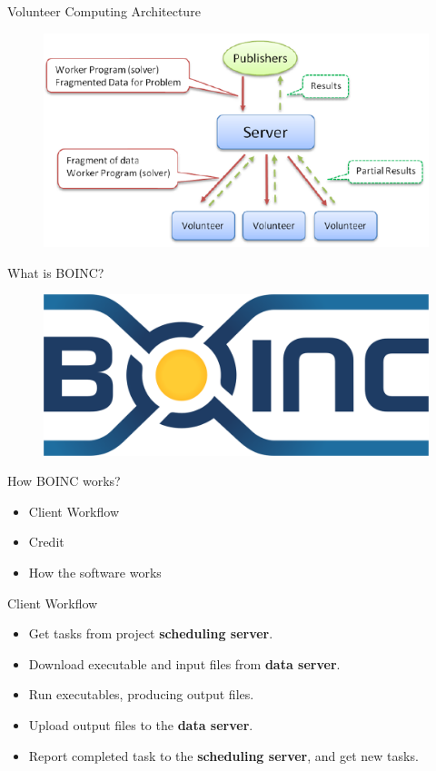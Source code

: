 \documentclass{beamer}
\begin{document}
\begin{frame}{Volunteer Computing Architecture}
\begin{figure}
  \includegraphics[width=\linewidth]{architecture.png}
\end{figure}
\end{frame}
%
\begin{frame}{What is BOINC?}
\begin{figure}
  \includegraphics[width=\linewidth]{boinc_logo.png}
\end{figure}
\end{frame}
%
\begin{frame}{How BOINC works?}
\begin{itemize}
\item Client Workflow
\item Credit
\item How the software works
\end{itemize}
\end{frame}
%
\begin{frame}{Client Workflow}
\begin{itemize}
\item Get tasks from project \textbf{scheduling server}.
\item Download executable and input files from \textbf{data server}.
\item Run executables, producing output files.
\item Upload output files to the \textbf{data server}.
\item Report completed task to the \textbf{scheduling server}, and get new tasks.
\end{itemize}
\end{frame}
\end{document}
